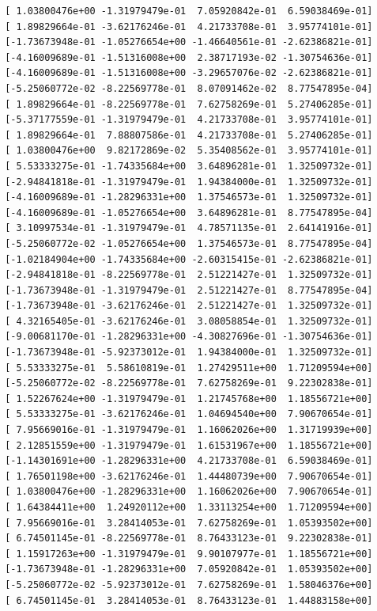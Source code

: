 \documentclass[
]{article}
\begin{document}
\begin{lstlisting}
 [ 1.03800476e+00 -1.31979479e-01  7.05920842e-01  6.59038469e-01]
 [ 1.89829664e-01 -3.62176246e-01  4.21733708e-01  3.95774101e-01]
 [-1.73673948e-01 -1.05276654e+00 -1.46640561e-01 -2.62386821e-01]
 [-4.16009689e-01 -1.51316008e+00  2.38717193e-02 -1.30754636e-01]
 [-4.16009689e-01 -1.51316008e+00 -3.29657076e-02 -2.62386821e-01]
 [-5.25060772e-02 -8.22569778e-01  8.07091462e-02  8.77547895e-04]
 [ 1.89829664e-01 -8.22569778e-01  7.62758269e-01  5.27406285e-01]
 [-5.37177559e-01 -1.31979479e-01  4.21733708e-01  3.95774101e-01]
 [ 1.89829664e-01  7.88807586e-01  4.21733708e-01  5.27406285e-01]
 [ 1.03800476e+00  9.82172869e-02  5.35408562e-01  3.95774101e-01]
 [ 5.53333275e-01 -1.74335684e+00  3.64896281e-01  1.32509732e-01]
 [-2.94841818e-01 -1.31979479e-01  1.94384000e-01  1.32509732e-01]
 [-4.16009689e-01 -1.28296331e+00  1.37546573e-01  1.32509732e-01]
 [-4.16009689e-01 -1.05276654e+00  3.64896281e-01  8.77547895e-04]
 [ 3.10997534e-01 -1.31979479e-01  4.78571135e-01  2.64141916e-01]
 [-5.25060772e-02 -1.05276654e+00  1.37546573e-01  8.77547895e-04]
 [-1.02184904e+00 -1.74335684e+00 -2.60315415e-01 -2.62386821e-01]
 [-2.94841818e-01 -8.22569778e-01  2.51221427e-01  1.32509732e-01]
 [-1.73673948e-01 -1.31979479e-01  2.51221427e-01  8.77547895e-04]
 [-1.73673948e-01 -3.62176246e-01  2.51221427e-01  1.32509732e-01]
 [ 4.32165405e-01 -3.62176246e-01  3.08058854e-01  1.32509732e-01]
 [-9.00681170e-01 -1.28296331e+00 -4.30827696e-01 -1.30754636e-01]
 [-1.73673948e-01 -5.92373012e-01  1.94384000e-01  1.32509732e-01]
 [ 5.53333275e-01  5.58610819e-01  1.27429511e+00  1.71209594e+00]
 [-5.25060772e-02 -8.22569778e-01  7.62758269e-01  9.22302838e-01]
 [ 1.52267624e+00 -1.31979479e-01  1.21745768e+00  1.18556721e+00]
 [ 5.53333275e-01 -3.62176246e-01  1.04694540e+00  7.90670654e-01]
 [ 7.95669016e-01 -1.31979479e-01  1.16062026e+00  1.31719939e+00]
 [ 2.12851559e+00 -1.31979479e-01  1.61531967e+00  1.18556721e+00]
 [-1.14301691e+00 -1.28296331e+00  4.21733708e-01  6.59038469e-01]
 [ 1.76501198e+00 -3.62176246e-01  1.44480739e+00  7.90670654e-01]
 [ 1.03800476e+00 -1.28296331e+00  1.16062026e+00  7.90670654e-01]
 [ 1.64384411e+00  1.24920112e+00  1.33113254e+00  1.71209594e+00]
 [ 7.95669016e-01  3.28414053e-01  7.62758269e-01  1.05393502e+00]
 [ 6.74501145e-01 -8.22569778e-01  8.76433123e-01  9.22302838e-01]
 [ 1.15917263e+00 -1.31979479e-01  9.90107977e-01  1.18556721e+00]
 [-1.73673948e-01 -1.28296331e+00  7.05920842e-01  1.05393502e+00]
 [-5.25060772e-02 -5.92373012e-01  7.62758269e-01  1.58046376e+00]
 [ 6.74501145e-01  3.28414053e-01  8.76433123e-01  1.44883158e+00]

\end{lstlisting}
\end{document}
